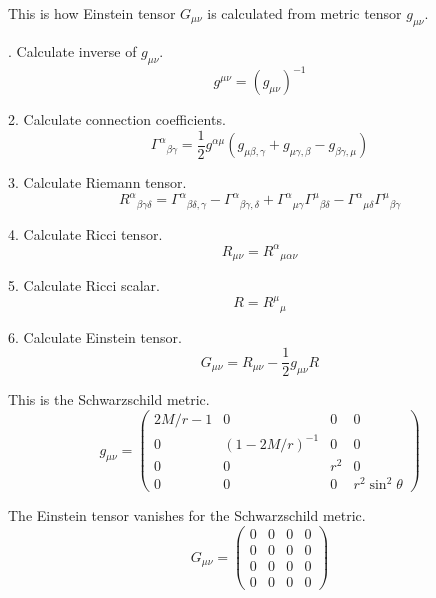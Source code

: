 \documentclass[12pt]{article}
\begin{document}
This is how Einstein tensor $G_{\mu\nu}$ is calculated from metric tensor $g_{\mu\nu}$.

. Calculate inverse of $g_{\mu\nu}$.
\begin{equation*}
g^{\mu\nu}=(g_{\mu\nu})^{-1}
\end{equation*}

2. Calculate connection coefficients.
\begin{equation*}
\Gamma^\alpha{}_{\beta\gamma}=\frac{1}{2}
g^{\alpha\mu}(g_{\mu\beta,\gamma}+g_{\mu\gamma,\beta}-g_{\beta\gamma,\mu})
\end{equation*}

3. Calculate Riemann tensor.
\begin{equation*}
R^\alpha{}_{\beta\gamma\delta}
=\Gamma^\alpha{}_{\beta\delta,\gamma}
-\Gamma^\alpha{}_{\beta\gamma,\delta}
+\Gamma^\alpha{}_{\mu\gamma}\Gamma^\mu{}_{\beta\delta}
-\Gamma^\alpha{}_{\mu\delta}\Gamma^\mu{}_{\beta\gamma}
\end{equation*}

4. Calculate Ricci tensor.
\begin{equation*}
R_{\mu\nu}=R^\alpha{}_{\mu\alpha\nu}
\end{equation*}

5. Calculate Ricci scalar.
\begin{equation*}
R=R^\mu{}_\mu
\end{equation*}

6. Calculate Einstein tensor.
\begin{equation*}
G_{\mu\nu}=R_{\mu\nu}-\frac{1}{2}g_{\mu\nu}R
\end{equation*}

This is the Schwarzschild metric.
\begin{equation*}
g_{\mu\nu}=\begin{pmatrix}
2M/r-1 & 0 & 0 & 0
\\
0 & (1 - 2M/r)^{-1} & 0 & 0
\\
0 & 0 & r^2 & 0
\\
0 & 0 & 0 & r^2\sin^2\theta
\end{pmatrix}
\end{equation*}

The Einstein tensor vanishes for the Schwarzschild metric.
\begin{equation*}
G_{\mu\nu}=\begin{pmatrix}
0 & 0 & 0 & 0
\\
0 & 0 & 0 & 0
\\
0 & 0 & 0 & 0
\\
0 & 0 & 0 & 0
\end{pmatrix}
\end{equation*}
\end{document}
